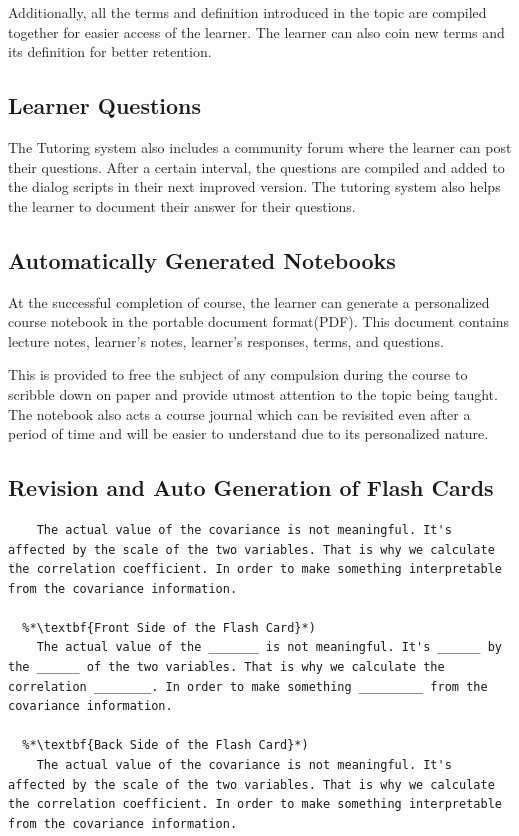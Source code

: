 \documentclass[]{article}
\begin{document}
Additionally, all the terms and definition introduced in the topic are compiled together for easier access of the learner. The learner can also coin new terms and its definition for better retention. 

\subsection[Learner Questions]{Learner Questions}

The Tutoring system also includes a community forum where the learner can post their questions. After a certain interval, the questions are compiled and added to the dialog scripts in their next improved version. The tutoring system also helps the learner to document their answer for their questions. 

\subsection[Notebooks]{Automatically Generated Notebooks}


At the successful completion of course, the learner can generate a personalized course notebook in the portable document format(PDF). This document contains lecture notes, learner's notes, learner's responses, terms, and questions.  

This is provided to free the subject of any compulsion during the course to scribble down on paper and provide utmost attention to the topic being taught. The notebook also acts a course journal which can be revisited even after a period of time and will be easier to understand due to its personalized nature.


\subsection[Revision]{Revision and Auto Generation of Flash Cards}
\begin{lstlisting}[frame=none,caption=Automatic Generation of Flash Cards from User Notes,label=list7]
  %*\textbf{User Notes}*) 
    The actual value of the covariance is not meaningful. It's affected by the scale of the two variables. That is why we calculate the correlation coefficient. In order to make something interpretable from the covariance information.

  %*\textbf{Front Side of the Flash Card}*)
    The actual value of the _______ is not meaningful. It's ______ by the ______ of the two variables. That is why we calculate the correlation ________. In order to make something _________ from the covariance information.
  
  %*\textbf{Back Side of the Flash Card}*)
    The actual value of the covariance is not meaningful. It's affected by the scale of the two variables. That is why we calculate the correlation coefficient. In order to make something interpretable from the covariance information.
  \end{lstlisting}
\end{document}
